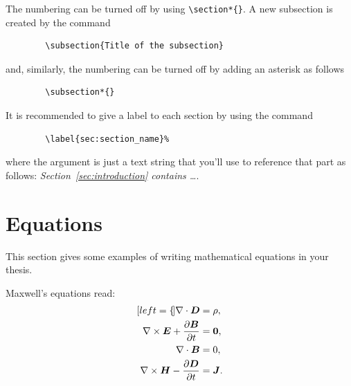 \documentclass[11pt,a4paper]{article}
\begin{document}
    The numbering can be turned off by using \verb|\section*{}|. A new subsection is created by the command

    \begin{verbatim}
        \subsection{Title of the subsection}
    \end{verbatim}

    and, similarly, the numbering can be turned off by adding an asterisk as follows 

    \begin{verbatim}
        \subsection*{}
    \end{verbatim}

    It is recommended to give a label to each section by using the command

    \begin{verbatim}
        \label{sec:section_name}%
    \end{verbatim}

    where the argument is just a text string that you'll use to reference that part as follows: \textit{Section~\ref{sec:introduction} contains   \dots}.

\section{Equations}

    \label{sec:eqs}
    This section gives some examples of writing mathematical equations in your thesis.

    Maxwell's equations read:
    \begin{subequations}
        \label{eq:maxwell}
        \begin{align}[left=\empheqlbrace]
            \nabla\cdot \bm{D} & = \rho, \label{eq:maxwell1} \\
            \nabla \times \bm{E} +  \frac{\partial \bm{B}}{\partial t} & = \bm{0}, \label{eq:maxwell2} \\
            \nabla\cdot \bm{B} & = 0, \label{eq:maxwell3} \\
            \nabla \times \bm{H} - \frac{\partial \bm{D}}{\partial t} &= \bm{J}. \label{eq:maxwell4}
        \end{align}
    \end{subequations}
\end{document}
